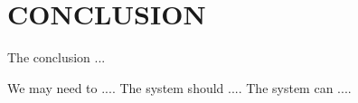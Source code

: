 \chapter{CONCLUSION}


The conclusion ... 

 


\begin{kkuplainsection}
\kkusubsection {}   We may need to ....
\kkusubsection {}   The system should ....
\kkusubsection {}   The system can ....
\end{kkuplainsection}
